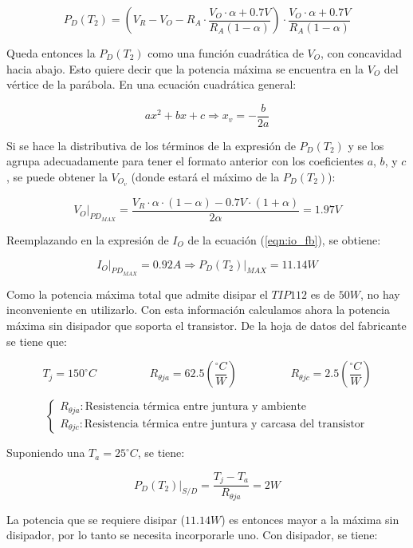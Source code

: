 \[
P_D(T_2) = \left( V_R - V_O - R_A \cdot \frac{V_O \cdot \alpha + 0.7V}{R_A(1-\alpha)}\right) \cdot \frac{V_O \cdot \alpha + 0.7V}{R_A(1-\alpha)}
\]  

Queda entonces la $P_D(T_2)$ como una funci\'on cuadr\'atica de $V_O$, con concavidad hacia abajo. Esto quiere decir que la potencia m\'axima se encuentra en la $V_O$ del v\'ertice de la par\'abola. En una ecuaci\'on cuadr\'atica general:

\[
ax^2 + bx + c \Longrightarrow x_v = -\frac{b}{2a} 
\]

Si se hace la distributiva de los t\'erminos de la expresi\'on de $P_D(T_2)$ y se los agrupa adecuadamente para tener el formato anterior con los coeficientes $a$, $b$, y $c$, se puede obtener la $V_{O_v}$ (donde estar\'a el m\'aximo de la $P_D(T_2)$):

\[
V_O \biggr|_{PD_{MAX}} = \frac{V_R \cdot \alpha \cdot (1-\alpha) - 0.7V \cdot (1+\alpha)}{2\alpha} = 1.97V
\]

Reemplazando en la expresi\'on de $I_O$ de la ecuaci\'on (\ref{eqn:io_fb}), se obtiene:

\[
I_O \biggr|_{PD_{MAX}} = 0.92A \Longrightarrow P_D(T_2) \biggr|_{MAX} = 11.14W
\]
 
Como la potencia m\'axima total que admite disipar el $TIP112$ es de $50W$, no hay inconveniente en utilizarlo. Con esta informaci\'on calculamos ahora la potencia m\'axima sin disipador que soporta el transistor. De la hoja de datos del fabricante se tiene que:

\[
T_j = 150^{\circ}C  \hspace{2cm} R_{\theta ja} = 62.5 \left( \frac{^{\circ}C}{W}\right) \hspace{2cm} R_{\theta jc} = 2.5 \left(\frac{^{\circ}C}{W}\right)
\] 
 
\[
\left\lbrace
\begin{array}{l}
R_{\theta ja}: \textrm{Resistencia t\'ermica entre juntura y ambiente} \\
R_{\theta jc}: \textrm{Resistencia t\'ermica entre juntura y carcasa del transistor}
\end{array}
\right.
\] 
 
\newpage 
 
Suponiendo una $T_a = 25^{\circ}C$, se tiene:

\[
P_D(T_2) \biggr|_{S/D} = \frac{T_j - T_a}{R_{\theta ja}} = 2W
\]
 
La potencia que se requiere disipar ($11.14W$) es entonces mayor a la m\'axima sin disipador, por lo tanto se necesita incorporarle uno. Con disipador, se tiene:

